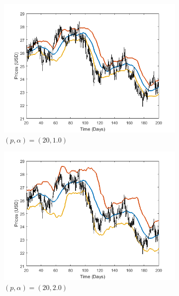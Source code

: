 \documentclass[11pt,a4,twosided,singlespacing,titlepagenumber=on]{scrreprt}
\numberwithin{equation}{chapter} %
\theoremstyle{remark}
\begin{document}
\begin{figure}[H]
    \centering
    \begin{subfigure}[t]{0.49\textwidth}
        \centering
        \includegraphics[width=1\textwidth]{bollinger/1}
        \caption{$(p, \alpha) = (20,1.0)$}
        \label{bollinger1}
    \end{subfigure}
    \begin{subfigure}[t]{0.49\textwidth}
        \centering
        \includegraphics[width=1\textwidth]{bollinger/2}
        \caption{$(p, \alpha) = (20,2.0)$}
        \label{bollinger2}
    \end{subfigure}
    \begin{subfigure}[t]{0.49\textwidth}
        \centering

\end{subfigure}
\end{figure}
\end{document}
